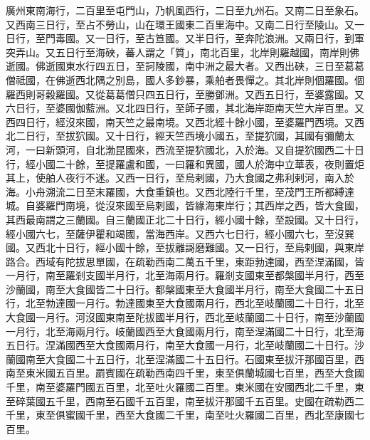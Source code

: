 \begin{pinyinscope}
 廣州東南海行，二百里至屯門山，乃帆風西行，二日至九州石。又南二日至象石。又西南三日行，至占不勞山，山在環王國東二百里海中。又南二日行至陵山。又一日行，至門毒國。又一日行，至古笪國。又半日行，至奔陀浪洲。又兩日行，到軍突弄山。又五日行至海硤，蕃人謂之「質」，南北百里，北岸則羅越國，南岸則佛逝國。佛逝國東水行四五日，至訶陵國，南中洲之最大者。又西出硤，三日至葛葛僧祗國，在佛逝西北隅之別島，國人多鈔暴，乘舶者畏憚之。其北岸則個羅國。個羅西則哥穀羅國。又從葛葛僧只四五日行，至勝鄧洲。又西五日行，至婆露國。又六日行，至婆國伽藍洲。又北四日行，至師子國，其北海岸距南天竺大岸百里。又西四日行，經沒來國，南天竺之最南境。又西北經十餘小國，至婆羅門西境。又西北二日行，至拔狖國。又十日行，經天竺西境小國五，至提狖國，其國有彌蘭太河，一曰新頭河，自北渤昆國來，西流至提狖國北，入於海。又自提狖國西二十日行，經小國二十餘，至提羅盧和國，一曰羅和異國，國人於海中立華表，夜則置炬其上，使舶人夜行不迷。又西一日行，至烏剌國，乃大食國之弗利剌河，南入於海。小舟溯流二日至末羅國，大食重鎮也。又西北陸行千里，至茂門王所都縛達城。自婆羅門南境，從沒來國至烏剌國，皆緣海東岸行；其西岸之西，皆大食國，其西最南謂之三蘭國。自三蘭國正北二十日行，經小國十餘，至設國。又十日行，經小國六七，至薩伊瞿和竭國，當海西岸。又西六七日行，經小國六七，至沒巽國。又西北十日行，經小國十餘，至拔離謌磨難國。又一日行，至烏剌國，與東岸路合。西域有陀拔思單國，在疏勒西南二萬五千里，東距勃達國，西至涅滿國，皆一月行，南至羅剎支國半月行，北至海兩月行。羅剎支國東至都槃國半月行，西至沙蘭國，南至大食國皆二十日行。都槃國東至大食國半月行，南至大食國二十五日行，北至勃達國一月行。勃達國東至大食國兩月行，西北至岐蘭國二十日行，北至大食國一月行。河沒國東南至陀拔國半月行，西北至岐蘭國二十日行，南至沙蘭國一月行，北至海兩月行。岐蘭國西至大食國兩月行，南至涅滿國二十日行，北至海五日行。涅滿國西至大食國兩月行，南至大食國一月行，北至岐蘭國二十日行。沙蘭國南至大食國二十五日行，北至涅滿國二十五日行。石國東至拔汗那國百里，西南至東米國五百里。罽賓國在疏勒西南四千里，東至俱蘭城國七百里，西至大食國千里，南至婆羅門國五百里，北至吐火羅國二百里。東米國在安國西北二千里，東至碎葉國五千里，西南至石國千五百里，南至拔汗那國千五百里。史國在疏勒西二千里，東至俱蜜國千里，西至大食國二千里，南至吐火羅國二百里，西北至康國七百里。



\end{pinyinscope}